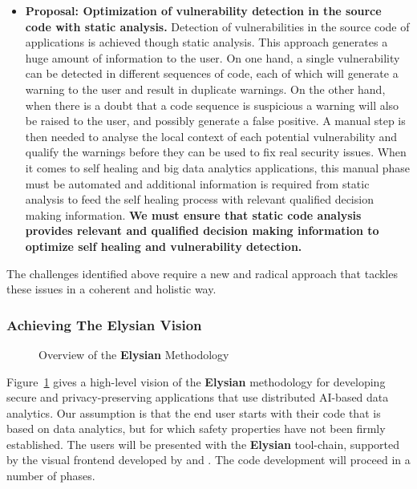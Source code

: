 \documentclass[a4paper,11pt]{article}
\newcommand{\project}[1]{\textbf{#1}\xspace}
\newcommand{\SECURITY}{\project{Elysian}}
\newcommand{\TheProject}{\SECURITY}
\begin{document}
\begin{itemize}
\item {\color{blue} \textbf{\YAGshort{} Proposal: Optimization of vulnerability detection in the source code with static analysis.}} Detection of vulnerabilities in the source code of applications is achieved though static analysis. This approach generates a huge amount of information to the user. On one hand, a single vulnerability can be detected in different sequences of code, each of which will generate a warning to the user and result in duplicate warnings. On the other hand, when there is a doubt that a code sequence is suspicious a warning will also be raised to the user, and possibly generate a false positive. A manual step is then needed to analyse the local context of each potential vulnerability and qualify the warnings before they can be used to fix real security issues. When it comes to self healing and big data analytics applications, this manual phase must be automated and additional information is required from static analysis to feed the self healing process with relevant qualified decision making information.
\textbf{We must ensure that static code analysis provides relevant and qualified decision making information to optimize self healing and vulnerability detection.} 

\end{itemize}


The challenges identified above require a new and radical
approach that tackles these issues in a coherent and
holistic way. 

\subsubsection{Achieving The \TheProject{} Vision}

\begin{figure}[tp]
  \begin{center}
  \vspace{-5mm}
  \caption{Overview of the \TheProject{} Methodology}
  \label{fig:overview}
  \end{center}
  \end{figure}

Figure~\ref{fig:overview} gives a high-level vision of the \TheProject{} methodology for developing secure and privacy-preserving applications that use distributed AI-based data analytics. Our assumption is that the end user starts with their code that is based on data analytics, but for which safety properties have not been firmly established. The users will be presented with the \TheProject{} tool-chain, supported by the visual frontend developed by \USTANshort{} and \YAGshort{}. The code development will proceed in a number of phases.
\end{document}
